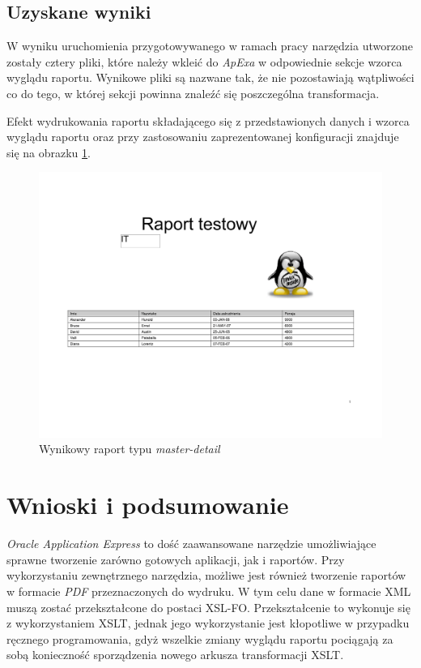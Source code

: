 \documentclass[11pt,a4paper]{article}
\begin{document}
\subsection{Uzyskane wyniki} \label{test:result}
W wyniku uruchomienia przygotowywanego w ramach pracy narzędzia utworzone zostały cztery pliki, które należy wkleić do \emph{ApExa} w odpowiednie sekcje wzorca wyglądu raportu. Wynikowe pliki są nazwane tak, że nie pozostawiają wątpliwości co do tego, w której sekcji powinna znaleźć się poszczególna transformacja. 

Efekt wydrukowania raportu składającego się z przedstawionych danych i wzorca wyglądu raportu oraz przy zastosowaniu zaprezentowanej konfiguracji znajduje się na obrazku \ref{img:wynikowy}.

\begin{figure}[p]
\centering
\includegraphics[scale=0.25,angle=90]{test-md}
\caption{Wynikowy raport typu \emph{master-detail}}
\label{img:wynikowy}
\end{figure}

\newpage

\section{Wnioski i podsumowanie}
\emph{Oracle Application Express} to dość zaawansowane narzędzie umożliwiające sprawne tworzenie zarówno gotowych aplikacji, jak i raportów. Przy wykorzystaniu zewnętrznego narzędzia, możliwe jest również tworzenie raportów w formacie \emph{PDF} przeznaczonych do wydruku. W tym celu dane w formacie XML muszą zostać przekształcone do postaci XSL-FO. Przekształcenie to wykonuje się z wykorzystaniem XSLT, jednak jego wykorzystanie jest kłopotliwe w przypadku ręcznego programowania, gdyż wszelkie zmiany wyglądu raportu pociągają za sobą konieczność sporządzenia nowego arkusza transformacji XSLT.
\end{document}
